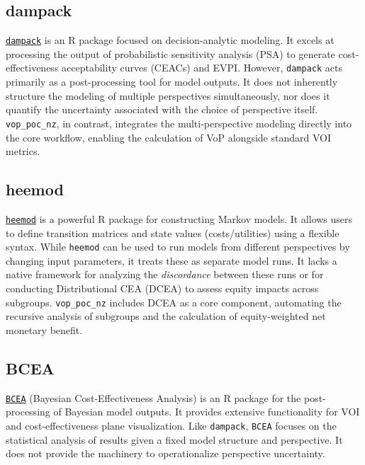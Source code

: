 \documentclass{article}
\newcommand{\pkg}[1]{\texttt{#1}}
\newcommand{\proglang}[1]{\textsf{#1}}
\begin{document}
\subsection[dampack]{dampack}
\href{https://github.com/DARTH-git/dampack}{\pkg{dampack}} \citep{alarid2024} is an \proglang{R} package focused on decision-analytic modeling.
It excels at processing the output of probabilistic sensitivity analysis (PSA) to generate cost-effectiveness acceptability curves (CEACs) and EVPI.
However, \pkg{dampack} acts primarily as a post-processing tool for model outputs.
It does not inherently structure the modeling of multiple perspectives simultaneously, nor does it quantify the uncertainty associated with the choice of perspective itself.
\pkg{vop\_poc\_nz}, in contrast, integrates the multi-perspective modeling directly into the core workflow, enabling the calculation of VoP alongside standard VOI metrics.

\subsection[heemod]{heemod}
\href{https://github.com/sbihorel/heemod}{\pkg{heemod}} \citep{filipovic2017} is a powerful \proglang{R} package for constructing Markov models.
It allows users to define transition matrices and state values (costs/utilities) using a flexible syntax.
While \pkg{heemod} can be used to run models from different perspectives by changing input parameters, it treats these as separate model runs.
It lacks a native framework for analyzing the \emph{discordance} between these runs or for conducting Distributional CEA (DCEA) to assess equity impacts across subgroups.
\pkg{vop\_poc\_nz} includes DCEA as a core component, automating the recursive analysis of subgroups and the calculation of equity-weighted net monetary benefit.

\subsection[BCEA]{BCEA}
\href{https://github.com/giabaio/BCEA}{\pkg{BCEA}} (Bayesian Cost-Effectiveness Analysis) \citep{baio2012} is an \proglang{R} package for the post-processing of Bayesian model outputs.
It provides extensive functionality for VOI and cost-effectiveness plane visualization.
Like \pkg{dampack}, \pkg{BCEA} focuses on the statistical analysis of results given a fixed model structure and perspective.
It does not provide the machinery to operationalize perspective uncertainty.
\end{document}
